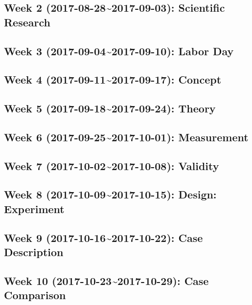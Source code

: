 \documentclass[11pt,]{article}
\begin{document}
\subsection{Week 2 (2017-08-28\textasciitilde{}2017-09-03): Scientific
Research}\label{week-2-2017-08-282017-09-03-scientific-research}

\subsection{Week 3 (2017-09-04\textasciitilde{}2017-09-10): Labor
Day}\label{week-3-2017-09-042017-09-10-labor-day}

\subsection{Week 4 (2017-09-11\textasciitilde{}2017-09-17):
Concept}\label{week-4-2017-09-112017-09-17-concept}

\subsection{Week 5 (2017-09-18\textasciitilde{}2017-09-24):
Theory}\label{week-5-2017-09-182017-09-24-theory}

\subsection{Week 6 (2017-09-25\textasciitilde{}2017-10-01):
Measurement}\label{week-6-2017-09-252017-10-01-measurement}

\subsection{Week 7 (2017-10-02\textasciitilde{}2017-10-08):
Validity}\label{week-7-2017-10-022017-10-08-validity}

\subsection{Week 8 (2017-10-09\textasciitilde{}2017-10-15): Design:
Experiment}\label{week-8-2017-10-092017-10-15-design-experiment}

\subsection{Week 9 (2017-10-16\textasciitilde{}2017-10-22): Case
Description}\label{week-9-2017-10-162017-10-22-case-description}

\subsection{Week 10 (2017-10-23\textasciitilde{}2017-10-29): Case
Comparison}\label{week-10-2017-10-232017-10-29-case-comparison}
\end{document}
